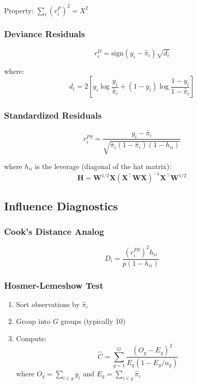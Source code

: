 \documentclass[11pt,letterpaper]{article}
\theoremstyle{definition}
\newcommand{\X}{\mathbf{X}}
\newcommand{\W}{\mathbf{W}}
\newcommand{\sign}{\mathrm{sign}}
\begin{document}
Property: $\sum_i (r_i^P)^2 = X^2$

\subsubsection{Deviance Residuals}

\begin{equation}
    r_i^D = \sign(y_i - \hat{\pi}_i) \sqrt{d_i}
    \label{eq:deviance-resid}
\end{equation}

where:
\begin{equation}
    d_i = 2\left[ y_i \log\frac{y_i}{\hat{\pi}_i} + (1-y_i) \log\frac{1-y_i}{1-\hat{\pi}_i} \right]
\end{equation}

\subsubsection{Standardized Residuals}

\begin{equation}
    r_i^{PS} = \frac{y_i - \hat{\pi}_i}{\sqrt{\hat{\pi}_i(1-\hat{\pi}_i)(1-h_{ii})}}
    \label{eq:std-resid}
\end{equation}

where $h_{ii}$ is the leverage (diagonal of the hat matrix):
\begin{equation}
    \mathbf{H} = \W^{1/2} \X (\X^\top \W \X)^{-1} \X^\top \W^{1/2}
\end{equation}

\subsection{Influence Diagnostics}

\subsubsection{Cook's Distance Analog}

\begin{equation}
    D_i = \frac{(r_i^{PS})^2 h_{ii}}{p(1-h_{ii})}
\end{equation}

\subsubsection{Hosmer-Lemeshow Test}

\begin{enumerate}
    \item Sort observations by $\hat{\pi}_i$
    \item Group into $G$ groups (typically 10)
    \item Compute:
    \begin{equation}
        \hat{C} = \sum_{g=1}^{G} \frac{(O_g - E_g)^2}{E_g(1 - E_g/n_g)}
    \end{equation}
    where $O_g = \sum_{i \in g} y_i$ and $E_g = \sum_{i \in g} \hat{\pi}_i$
\end{enumerate}
\end{document}

